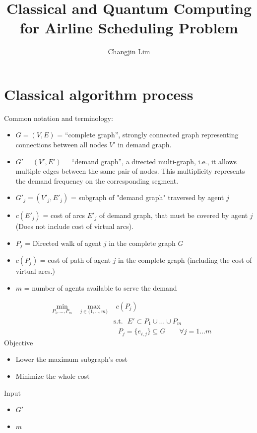 \documentclass{article}
\title{Classical and Quantum Computing for Airline Scheduling Problem}
\author[1]{Changjin Lim}
\date{}
\begin{document}
\maketitle

\begin{abstract}
\end{abstract}

\section{Classical algorithm process}

Common notation and terminology:
\begin{itemize}
    \item $G=(V, E)$ = ``complete graph'', strongly connected graph representing connections between all nodes $V'$ in demand graph.
    \item $G'=(V',E')$ = ``demand graph'', a directed multi-graph, i.e., it allows multiple edges between the same pair of nodes. This multiplicity represents the demand frequency on the corresponding segment.    
    \item $G'_j=(V'_j,E'_j)$ = subgraph of "demand graph" traversed by agent $j$
    \item $c(E'_j)$ = cost of arcs $E'_j$ of demand graph, that must be covered by agent $j$  (Does not include cost of virtual arcs).
    \item $P_j$ = Directed walk of agent $j$ in the complete graph $G$
    
    \item $c(P_j)$ = cost of path of agent $j$ in the complete graph (including the cost of virtual arcs.)
    \item $m$ = number of agents available to serve the demand
\end{itemize}

\begin{subequations} \label{eq:maep_0}
\begin{alignat}{2}
&\min_{{P_1}, \ldots, P_m} & \, \, \max_{j \in \{1,\ldots,m\}} & \, \, c(P_j)
\\
& &  & \text{s.t. } \, \, E' \subset  P_1 \cup \ldots \cup P_m 
\\
&&& \,\, \, \,  P_j=\{e_{i,j}\} \subseteq G \qquad \forall j=1\dots m
\end{alignat}
\end{subequations}
Objective
\begin{itemize}
    \item  Lower the maximum subgraph’s cost 
    \item Minimize the whole cost
\end{itemize}
Input
\begin{itemize}
    \item $G'$ 
    \item $m$
\end{itemize}
\end{document}
